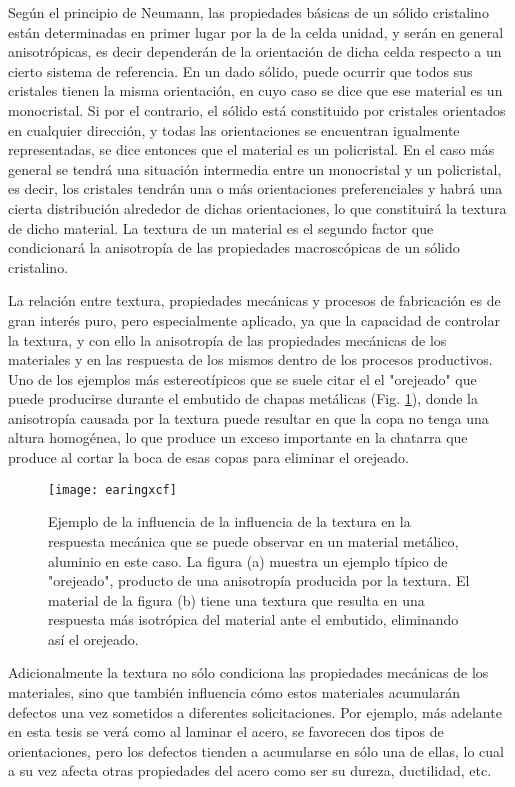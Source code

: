 Según el principio de Neumann\cite{nye1985physical}, las propiedades básicas de un sólido cristalino están determinadas en primer lugar por la de la celda unidad, y serán en general anisotrópicas, es decir dependerán de la orientación de dicha celda respecto a un cierto sistema de referencia.
En un dado sólido, puede ocurrir que todos sus cristales tienen la misma orientación, en cuyo caso se dice que ese material es un monocristal. Si por el contrario, el sólido está constituido por cristales orientados en cualquier dirección, y todas las orientaciones se encuentran igualmente representadas, se dice entonces que el material es un policristal. 
En el caso más general se tendrá una situación intermedia entre un monocristal y un policristal, es decir, los cristales tendrán una o más orientaciones preferenciales y habrá una cierta distribución alrededor de dichas orientaciones, lo que constituirá la textura de dicho material. La textura de un material es el segundo factor que condicionará la anisotropía de las propiedades macroscópicas de un sólido cristalino.

La relación entre textura, propiedades mecánicas y procesos de fabricación es de gran interés puro, pero especialmente aplicado, ya que la capacidad de controlar la textura, y con ello la anisotropía de las propiedades mecánicas de los materiales y en las respuesta de los mismos dentro de los procesos productivos. 
Uno de los ejemplos más estereotípicos que se suele citar el el "orejeado" que puede producirse durante el embutido de chapas metálicas (Fig. \ref{fig:earing}), donde la anisotropía causada por la textura puede resultar en que la copa no tenga una altura homogénea, lo que produce un exceso importante en la chatarra que produce al cortar la boca de esas copas para eliminar el orejeado.

\begin{figure}[h!]
  \centering
  \texttt{[image: earingxcf]}
  \caption{Ejemplo de la influencia de la influencia de la textura en la respuesta mecánica que se puede observar en un material metálico, aluminio en este caso. La figura (a) muestra un ejemplo típico de "orejeado", producto de una anisotropía producida por la textura. El material de la figura (b) tiene una textura que resulta en una respuesta más isotrópica del material ante el embutido, eliminando así el orejeado. }
  \label{fig:earing}
\end{figure}

Adicionalmente la textura no sólo condiciona las propiedades mecánicas de los materiales, sino que también influencia cómo estos materiales acumularán defectos una vez sometidos a diferentes solicitaciones. Por ejemplo, más adelante en esta tesis se verá como al laminar el acero, se favorecen dos tipos de orientaciones, pero los defectos tienden a acumularse en sólo una de ellas, lo cual a su vez afecta otras propiedades del acero como ser su dureza, ductilidad, etc.

